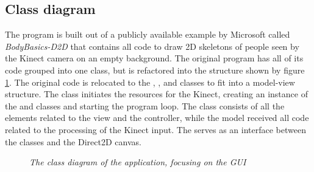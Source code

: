 \subsection{Class diagram}

The program is built out of a publicly available example by Microsoft called \emph{BodyBasics-D2D} that contains all code to draw 2D skeletons of people seen by the Kinect camera on an empty background. The original program has all of its code grouped into one class, but is refactored into the structure shown by figure \ref{fig: gui_classdiagram}. The original code is relocated to the , ,  and  classes to fit into a model-view structure. The  class initiates the resources for the Kinect, creating an instance of the  and  classes and starting the program loop. The  class consists of all the elements related to the view and the controller, while the model received all code related to the processing of the Kinect input. The  serves as an interface between the  classes and the Direct2D canvas.\\

\begin{figure}[H]
\caption{\emph{The class diagram of the application, focusing on the GUI}}
\label{fig: gui_classdiagram}
\end{figure}

